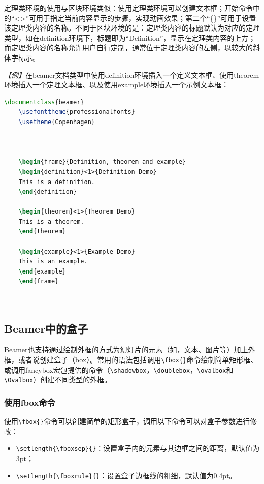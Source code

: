 定理类环境的使用与区块环境类似：使用定理类环境可以创建文本框；开始命令中的“<>”可用于指定当前内容显示的步骤，实现动画效果；第二个“\{\}”可用于设置该定理类内容的名称。不同于区块环境的是：定理类内容的标题默认为对应的定理类型，如在definition环境下，标题即为“Definition”，显示在定理类内容的上方；而定理类内容的名称允许用户自行定制，通常位于定理类内容的左侧，以较大的斜体字标示。

\emph{【例】}在beamer文档类型中使用definition环境插入一个定义文本框、使用theorem环境插入一个定理文本框、以及使用example环境插入一个示例文本框：
\begin{lstlisting}[language=TeX]
    \documentclass{beamer}
    \usefonttheme{professionalfonts}
    \usetheme{Copenhagen}

    

    \begin{frame}{Definition, theorem and example}
    \begin{definition}<1>{Definition Demo}
    This is a definition.
    \end{definition}

    \begin{theorem}<1>{Theorem Demo}
    This is a theorem.
    \end{theorem}

    \begin{example}<1>{Example Demo}
    This is an example.
    \end{example}
    \end{frame}

    
\end{lstlisting}

\subsection{Beamer中的盒子}

Beamer也支持通过绘制外框的方式为幻灯片的元素（如，文本、图片等）加上外框，或者说创建盒子（box）。常用的语法包括调用\texttt{\textbackslash{}fbox\{\}}命令绘制简单矩形框、或调用fancybox宏包提供的命令（\texttt{\textbackslash{}shadowbox}，\texttt{\textbackslash{}doublebox}，\texttt{\textbackslash{}ovalbox}和\texttt{\textbackslash{}Ovalbox}）创建不同类型的外框。

\subsubsection{使用fbox命令}

使用\texttt{\textbackslash{}fbox\{\}}命令可以创建简单的矩形盒子，调用以下命令可以对盒子参数进行修改：
\begin{itemize}
    \item \texttt{\textbackslash{}setlength\{\textbackslash{}fboxsep\}\{\}}：设置盒子内的元素与其边框之间的距离，默认值为3pt；
    \item \texttt{\textbackslash{}setlength\{\textbackslash{}fboxrule\}\{\}}：设置盒子边框线的粗细，默认值为0.4pt。
\end{itemize}

